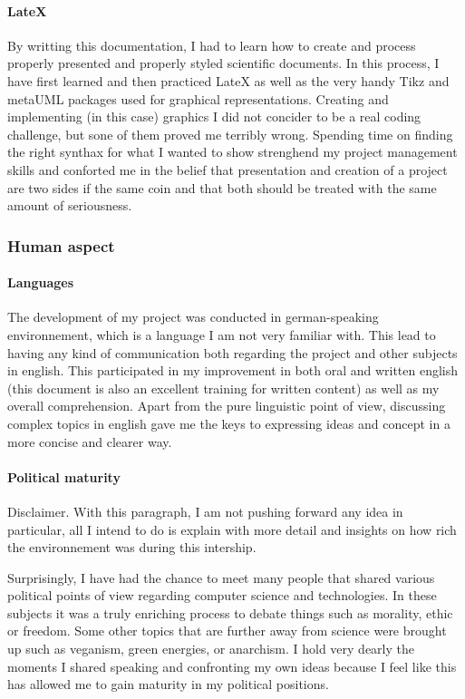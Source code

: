 \documentclass{article}
\begin{document}
			 \paragraph{LateX}
By writting this documentation, I had to learn how to create and process properly presented and properly styled scientific documents. In this process, I have first learned and then practiced LateX as well as the very handy Tikz and metaUML packages used for graphical representations.
Creating and implementing (in this case) graphics I did not concider to be a real coding challenge, but sone of them proved me terribly wrong. Spending time on finding the right synthax for what I wanted to show strenghend my project management skills and conforted me in the belief that presentation and creation of a project are two sides if the same coin and that both should be treated with the same amount of seriousness.  			  
	

		\subsubsection{Human aspect}
		
			\paragraph{Languages}
The development of my project was conducted in german-speaking environnement, which is a language I am not very familiar with. 
This lead to having any kind of communication both regarding the project and other subjects in english. This participated in my improvement in both oral and written english (this document is also an excellent training for written content) as well as my overall comprehension.
Apart from the pure linguistic point of view, discussing complex topics in english gave me the keys to expressing ideas and concept in a more concise and clearer way. 			

			\paragraph{Political maturity}
Disclaimer. With this paragraph, I am not pushing forward any idea in particular, all I intend to do is explain with more detail and insights on how rich the environnement was during this intership.			
			
Surprisingly, I have had the chance to meet many people that shared various political points of view regarding computer science and technologies. In these subjects it was a truly enriching process to debate things such as morality, ethic or freedom.
Some other topics that are further away from science were brought up such as veganism, green energies, or anarchism.
I hold very dearly the moments I shared speaking and confronting my own ideas because I feel like this has allowed me to gain maturity in my political positions.		
\end{document}
